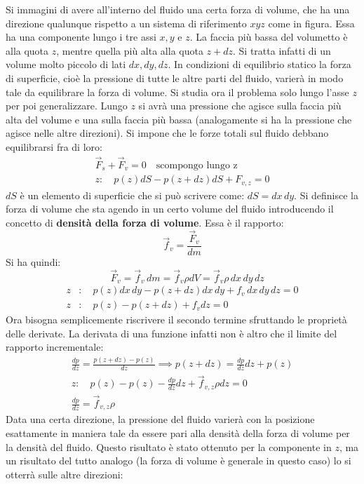 \documentclass[10pt,a4paper]{book}
\begin{document}
\FloatBarrier
Si immagini di avere all'interno del fluido una certa forza di volume, che ha una direzione qualunque rispetto a un sistema di riferimento $xyz$ come in figura. Essa ha una componente lungo i tre assi $x, y$ e $z$. La faccia più bassa del volumetto è alla quota $z$, mentre quella più alta alla quota $z+dz$. Si tratta infatti di un volume molto piccolo di lati $dx, dy, dz$. In condizioni di equilibrio statico la forza di superficie, cioè la pressione di tutte le altre parti del fluido, varierà in modo tale da equilibrare la forza di volume.  Si studia ora il problema solo lungo l'asse $z$ per poi generalizzare. Lungo $z$ si avrà una pressione che agisce sulla faccia più alta del volume e una sulla faccia più bassa (analogamente si ha la pressione che agisce nelle altre direzioni). Si impone che le forze totali sul fluido debbano equilibrarsi fra di loro:
\begin{gather*}
	\vec{F}_s + \vec{F}_v = 0 \quad \text{scompongo lungo z}\\
	z:\quad p(z)dS - p(z+dz)dS + F_{v,z} = 0
\end{gather*}
$dS$ è un elemento di superficie che si può scrivere come: $dS=dx\,dy$.
Si definisce la forza di volume che sta agendo in un certo volume del fluido introducendo il concetto di \textbf{densità della forza di volume}. Essa è il rapporto:
\[
	\vec{f}_v = \frac{\vec{F}_v }{dm} \]
Si ha quindi:
\[
	\quad \vec{F}_v = \vec{f}_v\,dm = \vec{f}_v\rho dV = \vec{f}_v\rho\,dx\,dy\,dz
\]
\begin{equation*}
	\begin{aligned}
		z&:\quad p(z)dx\,dy - p(z+dz)dx\,dy + f_v\,dx\,dy\,dz = 0 \\
		z&:\quad p(z) - p(z+dz) + f_v dz = 0
	\end{aligned}
\end{equation*}
Ora bisogna semplicemente riscrivere il secondo termine sfruttando le proprietà delle derivate. La derivata di una funzione infatti non è altro che il limite del rapporto incrementale:
\begin{gather*}
	\frac{dp}{dz} = \frac{p(z+dz)-p(z)}{dz} \implies p(z+dz)=\frac{dp}{dz}dz + p(z) \\
	z:\quad p(z)-p(z) - \frac{dp}{dz}dz + \vec{f}_{v,z}\rho dz =0 \\
	\frac{dp}{dz} = \vec{f}_{v,z}\rho
\end{gather*}
Data una certa direzione, la pressione del fluido varierà con la posizione esattamente in maniera tale da essere pari alla densità della forza di volume per la densità del fluido. Questo risultato è stato ottenuto per la componente in $z$, ma un risultato del tutto analogo (la forza di volume è generale in questo caso) lo si otterrà sulle altre direzioni:
\end{document}

